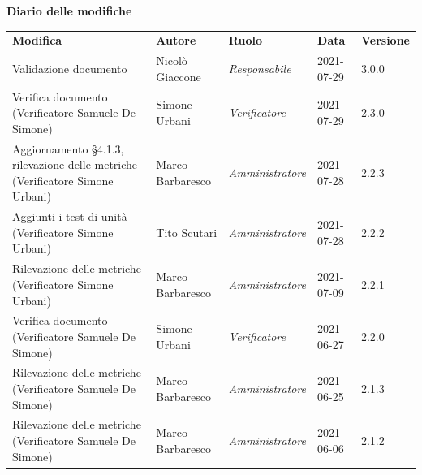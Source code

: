 \documentclass[a4paper]{article}
\begin{document}
\begin{center}
    \centering
    \textbf{\Large Diario delle modifiche}\\
    \vspace{10px}
    \renewcommand{\arraystretch}{1.8}
    \label{tab:Diario delle modifiche}
    \begin{longtable}[!h]{p{160px} p{80px} p{70px} p{55px} p{40px}}
        \rowcolor{logo!70} \textbf{Modifica}                                                     & \textbf{Autore}   & \textbf{Ruolo}          & \textbf{Data} & \textbf{Versione} \\
        Validazione documento                                                                    & Nicolò Giaccone   & \textit{Responsabile}   & 2021-07-29    & 3.0.0             \\
        Verifica documento \newline (Verificatore Samuele De Simone)                             & Simone Urbani     & \textit{Verificatore}   & 2021-07-29    & 2.3.0             \\
        Aggiornamento \S 4.1.3, rilevazione delle metriche \newline (Verificatore Simone Urbani) & Marco Barbaresco  & \textit{Amministratore} & 2021-07-28    & 2.2.3             \\
        Aggiunti i test di unità \newline (Verificatore Simone Urbani)                           & Tito Scutari      & \textit{Amministratore} & 2021-07-28    & 2.2.2             \\
        Rilevazione delle metriche \newline (Verificatore Simone Urbani)                         & Marco Barbaresco  & \textit{Amministratore} & 2021-07-09    & 2.2.1             \\
        Verifica documento \newline (Verificatore Samuele De Simone)                             & Simone Urbani     & \textit{Verificatore}   & 2021-06-27    & 2.2.0             \\
        Rilevazione delle metriche \newline (Verificatore Samuele De Simone)                     & Marco Barbaresco  & \textit{Amministratore} & 2021-06-25    & 2.1.3             \\
        Rilevazione delle metriche \newline (Verificatore Samuele De Simone)                     & Marco Barbaresco  & \textit{Amministratore} & 2021-06-06    & 2.1.2             \\

\end{longtable}
\end{center}
\end{document}
